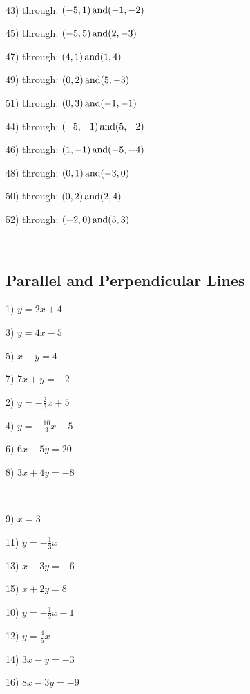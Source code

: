 \

{}

\begin{multicols}{2}
  43) through: $(- 5, 1) \operatorname{and} (- 1, - 2)$
  
  45) through: $(- 5, 5) \operatorname{and} (2, - 3)$
  
  47) through: $(4, 1) \operatorname{and} (1, 4)$
  
  49) through: $(0, 2) \operatorname{and} (5, - 3)$
  
  51) through: $(0, 3) \operatorname{and} (- 1, - 1)$
  
  44) through: $(- 5, - 1) \operatorname{and} (5, - 2)$
  
  46) through: $(1, - 1) \operatorname{and} (- 5, - 4)$
  
  48) through: $(0, 1) \operatorname{and} (- 3, 0)$
  
  50) through: $(0, 2) \operatorname{and} (2, 4)$
  
  52) through: $(- 2, 0) \operatorname{and} (5, 3)$
\end{multicols}

\vspace{2in}
~

\pagebreak

\subsection{Parallel and Perpendicular Lines}\par

{}

\begin{multicols}{2}
  1) $y = 2 x + 4$
  
  3) $y = 4 x - 5$
  
  5) $x - y = 4$
  
  7) $7 x + y = - 2$
  
  2) $y = - \frac{2}{3} x + 5$
  
  4) $y = - \frac{10}{3} x - 5$
  
  6) $6 x - 5 y = 20$
  
  8) $3 x + 4 y = - 8$
\end{multicols}

\

{}

\begin{multicols}{2}
  9) $x = 3$
  
  11) $y = - \frac{1}{3} x$
  
  13) $x - 3 y = - 6$
  
  15) $x + 2 y = 8$
  
  10) $y = - \frac{1}{2} x - 1$
  
  12) $y = \frac{4}{5} x$
  
  14) $3 x - y = - 3$
  
  16) $8 x - 3 y = - 9$
\end{multicols}

